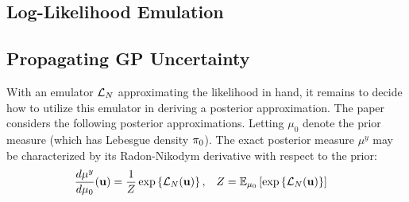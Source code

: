 \documentclass[12pt]{article}
\begin{document}
\subsection{Log-Likelihood Emulation}

\subsection{Propagating GP Uncertainty}
With an emulator $\mathcal{L}_{N}$ approximating the likelihood in hand, it remains to decide how to utilize this emulator in deriving a posterior approximation. 
The paper \cite{StuartTeck1} considers the following posterior approximations. Letting $\mu_0$ denote the prior measure (which has Lebesgue density 
$\pi_0$). The exact posterior measure $\mu^y$ may be characterized by its Radon-Nikodym derivative with respect to the prior:
\begin{align*}
\frac{d\mu^y}{d\mu_0}(\mathbf{u}) &= \frac{1}{Z} \exp\left\{\mathcal{L}_{N}(\mathbf{u}) \right\}, && Z = \mathbb{E}_{\mu_0}\left[\exp\left\{\mathcal{L}_{N}(\mathbf{u}) \right\}\right] 
\end{align*}
\end{document}
